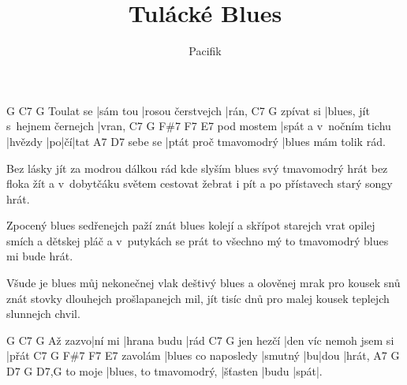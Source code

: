 \documentclass{song}
\title{Tulácké Blues}
\author{Pacifik}
\begin{document}
\strophe
          G        C7                G
Toulat se |sám tou |rosou čerstvejch |rán,
          C7                            G
zpívat si |blues, jít s~hejnem černejch |vran,
           C7                     G       F\#7 F7 E7
pod mostem |spát a v~nočním tichu |hvězdy |po|čí|tat
        A7                    D7
sebe se |ptát proč tmavomodrý |blues mám tolik rád.
\endstrophe

\strophe*
Bez lásky jít za modrou dálkou rád
kde slyším blues svý tmavomodrý hrát
bez floka žít a v~dobytčáku světem cestovat
žebrat i pít a po přístavech starý songy hrát. 
\endstrophe

\strophe*
Zpocený blues sedřenejch paží znát
blues kolejí a skřípot starejch vrat
opilej smích a dětskej pláč a v~putykách se prát
to všechno mý to tmavomodrý blues mi bude hrát.
\endstrophe

\strophe*
Všude je blues můj nekonečnej vlak
deštivý blues a olověnej mrak
pro kousek snů znát stovky dlouhejch prošlapanejch mil,
jít tisíc dnů pro malej kousek teplejch slunnejch chvil.
\endstrophe

\strophe
        G      C7          G
Až zazvo|ní mi |hrana budu |rád
          C7                     G
jen hezčí |den víc nemoh jsem si |přát
        C7                  G       F\#7 F7 E7
zavolám |blues co naposledy |smutný |bu|dou |hrát,
        A7                     G        D7   G    D7,G
to moje |blues, to tmavomodrý, |šťasten |budu |spát|.
\endstrophe
\end{document}
